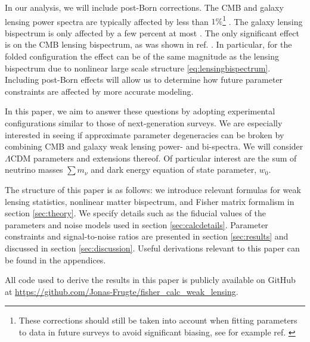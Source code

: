 \documentclass[11pt]{article} %
\begin{document}
In our analysis, we will include post-Born corrections. The CMB and galaxy lensing power spectra are typically affected by less than $1\%$\footnote{These corrections should still be taken into account when fitting parameters to data in future surveys to avoid significant biasing, see for example ref. \cite{Marozzi_2017}} \cite{postborn_pratten_lewis, galpostbornlpscorr, Marozzi_2016, Marozzi_2018}. The galaxy lensing bispectrum is only affected by a few percent at most \cite{galpostbornlbscorr}. The only significant effect is on the CMB lensing bispectrum, as was shown in ref. \cite{postborn_pratten_lewis}. In particular, for the folded configuration the effect can be of the same magnitude as the lensing bispectrum due to nonlinear large scale structure \eqref{eq:lensingbispectrum}. Including post-Born effects  will allow us to determine how future parameter constraints are affected by more accurate modeling.

In this paper, we aim to answer these questions by adopting experimental configurations similar to those of next-generation surveys. We are especially interested in seeing if approximate parameter degeneracies can be broken by combining CMB and galaxy weak lensing power- and bi-spectra. 
We will consider $\Lambda$CDM parameters and extensions thereof. Of particular interest are the sum of neutrino masses $\sum m_\nu$ and dark energy equation of state parameter, $w_0$. 

 

The structure of this paper is as follows: we introduce relevant formulas for weak lensing statistics, nonlinear matter bispectrum, and Fisher matrix formalism in section \ref{sec:theory}. We specify details such as the fiducial values of the parameters and noise models used in section \ref{sec:calcdetails}. Parameter constraints and signal-to-noise ratios are presented in section \ref{sec:results} and discussed in section \ref{sec:discussion}. Useful derivations relevant to this paper can be found in the appendices.

All code used to derive the results in this paper is publicly available on GitHub at \url{https://github.com/Jonas-Frugte/fisher_calc_weak_lensing}.
\end{document}

